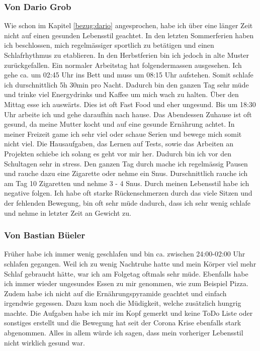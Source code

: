 \subsubsection{Von Dario Grob}
Wie schon im Kapitel \ref{bezug:dario} angesprochen, habe ich über eine länger Zeit nicht auf einen gesunden Lebensstil geachtet. In den letzten Sommerferien haben ich beschlossen, mich regelmässiger sportlich zu betätigen und einen Schlafrhythmus zu etablieren.
\newline
In den Herbstferien bin ich jedoch in alte Muster zurückgefallen. Ein normaler Arbeitstag hat folgendermassen ausgesehen.
\newline
Ich gehe ca. um 02:45 Uhr ins Bett und muss um 08:15 Uhr aufstehen. Somit schlafe ich durschnittlich 5h 30min pro Nacht. Dadurch bin den ganzen Tag sehr müde und trinke viel Energydrinks und Kaffee um mich wach zu halten. 
\newline
Über den Mittag esse ich auswärts. Dies ist oft Fast Food und eher ungesund.
\newline
Bis um 18:30 Uhr arbeite ich und gehe daraufhin nach hause. Das Abendessen Zuhause ist oft gesund, da meine Mutter kocht und auf eine gesunde Ernährung achtet. 
\newline
In meiner Freizeit game ich sehr viel oder schaue Serien und bewege mich somit nicht viel. 
\newline
Die Hausaufgaben, das Lernen auf Tests, sowie das Arbeiten an Projekten schiebe ich solang es geht vor mir her. Dadurch bin ich vor den Schultagen sehr in stress.
\newline
Den ganzen Tag durch mache ich regelmässig Pausen und rauche dazu eine Zigarette oder nehme ein Snus. Durschnittlich rauche ich am Tag 10 Zigaretten und nehme 3 - 4 Snus.
\newline
Durch meinen Lebensstil habe ich negative folgen. Ich habe oft starke Rückenschmerzen durch das viele Sitzen und der fehlenden Bewegung, bin oft sehr müde dadurch, dass ich sehr wenig schlafe und nehme in letzter Zeit an Gewicht zu.
\subsubsection{Von Bastian Büeler}
Früher habe ich immer wenig geschlafen und bin ca. zwischen 24:00-02:00 Uhr schlafen gegangen. Weil ich zu wenig Nachtruhe hatte und mein Körper viel mehr Schlaf gebraucht hätte, war ich am Folgetag oftmals sehr müde. Ebenfalls habe ich immer wieder ungesundes Essen zu mir genommen, wie zum Beispiel Pizza. Zudem habe ich nicht auf die Ernährungspyramide geachtet und einfach irgendwie gegessen. Dazu kam noch die Müdigkeit, welche zusätzlich hungrig machte. Die Aufgaben habe ich mir im Kopf gemerkt und keine ToDo Liste oder sonstiges erstellt und die Bewegung hat seit der Corona Krise ebenfalls stark abgenommen. Alles in allem würde ich sagen, dass mein vorheriger Lebensstil nicht wirklich gesund war.
